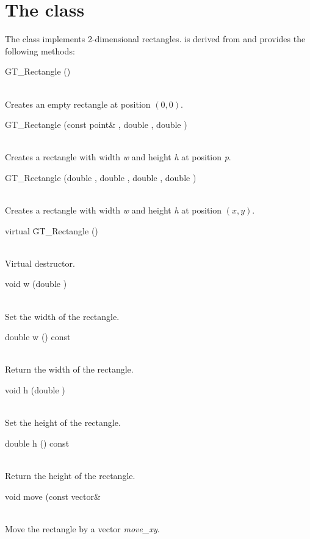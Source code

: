 \documentclass[twoside,fleqn]{report}
\begin{document}
\section{The class }


The class  implements 2-dimensional rectangles.  
 is derived from  and provides the following 
methods:

\begin{Cdefinition}


  \item[GT\_Rectangle ()] \strut\\
  Creates an empty rectangle at position $(0,0)$.

  \item[GT\_Rectangle (const point\& \Param{p}, double \Param{w}, double \Param{h})] \strut\\
  Creates a rectangle with width \emph{w} and height \emph{h} at 
  position \emph{p}.

  \item[GT\_Rectangle (double \Param{x}, double \Param{y}, double \Param{w}, double \Param{h})] \strut\\
  Creates a rectangle with width \emph{w} and height \emph{h} at 
  position $(x,y)$.

  \item[virtual \~GT\_Rectangle ()] \strut\\
  Virtual destructor.


  \item[void w (double \Param{new\_width})] \strut\\
  Set the width of the rectangle.
  \item[double w () const] \strut\\
  Return the width of the rectangle.
  \item[void h (double \Param{new\_height})] \strut\\
  Set the height of the rectangle.
  \item[double h () const] \strut\\
  Return the height of the rectangle.


  \item[void move (const vector\& \Param{move\_xy}] \strut\\
  Move the rectangle by a vector \emph{move\_xy}.


\end{Cdefinition}
\end{document}
